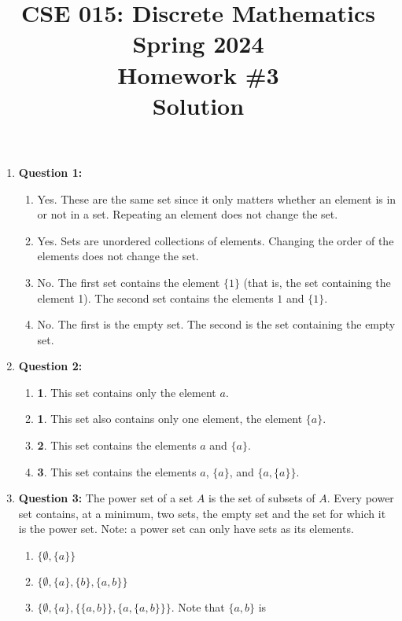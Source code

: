 \documentclass[11pt]{article}
\begin{document}
\title{CSE 015: Discrete Mathematics\\
Spring 2024\\
Homework \#3\\
Solution}
\date{}
\maketitle
\vspace{-2cm}
\begin{enumerate}
\item
\textbf{Question 1:}
\begin{enumerate}[label=(\alph*)]
\item Yes. These are the same set since it only matters whether an element is in or
not in a set. Repeating an element does not change the set.
\item Yes. Sets are unordered collections of elements. Changing the order of the
elements does not change the set.
\item No. The first set contains the element $\{1\}$ (that is, the set containing
the element 1). The second set contains the elements $1$ and $\{1\}$.
\item No. The first is the empty set. The second is the set containing the empty
set.
\end{enumerate}
\item
\textbf{Question 2:}
\begin{enumerate}[label=(\alph*)]
\item \textbf{1}. This set contains only the element $a$.
\item \textbf{1}. This set also contains only one element, the element $\{ a \}$.
\item \textbf{2}. This set contains the elements $a$ and $\{a\}$.
\item \textbf{3}. This set contains the elements $a$, $\{a\}$, and $\{a,\{a\}\}$.
\end{enumerate}
\item
\textbf{Question 3:}
The power set of a set $A$ is the set of subsets of $A$. Every power set contains,
at a minimum, two sets, the empty set and the set for which it is the power set.
Note: a power set can only have sets as its elements.
\begin{enumerate}[label=(\alph*)]
\item $\{\emptyset, \{a\} \}$
\item $\{\emptyset, \{a\}, \{b\}, \{a,b\}\}$
\item $\{ \emptyset, \{a\}, \{\{a,b\}\}, \{a,\{a,b\}\}\}$. Note that $\{a,b\}$ is

\end{enumerate}
\end{enumerate}
\end{document}
